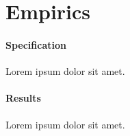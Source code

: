 \documentclass[paper.tex]{subfiles}
\begin{document}
\section{Empirics}\label{s:empirics}

\paragraph{Specification} Lorem ipsum dolor sit amet.

\paragraph{Results} Lorem ipsum dolor sit amet.
\end{document}
